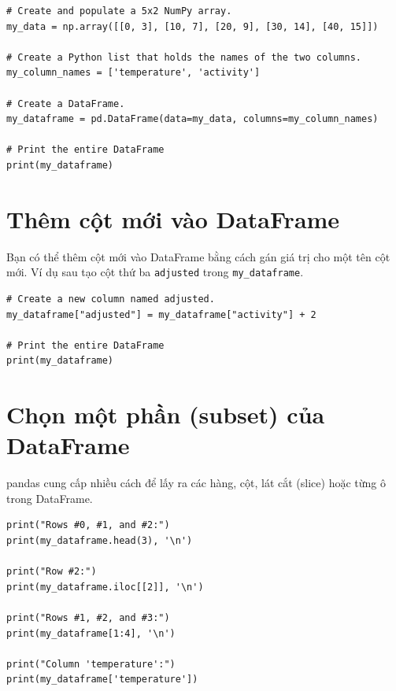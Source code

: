 \documentclass[12pt,a4paper]{article}
\begin{document}
\begin{lstlisting}
# Create and populate a 5x2 NumPy array.
my_data = np.array([[0, 3], [10, 7], [20, 9], [30, 14], [40, 15]])

# Create a Python list that holds the names of the two columns.
my_column_names = ['temperature', 'activity']

# Create a DataFrame.
my_dataframe = pd.DataFrame(data=my_data, columns=my_column_names)

# Print the entire DataFrame
print(my_dataframe)
\end{lstlisting}

\section{Thêm cột mới vào DataFrame}

\begin{phuongphap}[title={Tạo cột mới bằng phép gán}]
Bạn có thể thêm cột mới vào DataFrame bằng cách gán giá trị cho một tên cột mới.
Ví dụ sau tạo cột thứ ba \texttt{adjusted} trong \texttt{my\_dataframe}.
\end{phuongphap}

\begin{lstlisting}
# Create a new column named adjusted.
my_dataframe["adjusted"] = my_dataframe["activity"] + 2

# Print the entire DataFrame
print(my_dataframe)
\end{lstlisting}

\section{Chọn một phần (subset) của DataFrame}

\begin{phuongphap}[title={Lấy hàng/cột/đoạn con}]
pandas cung cấp nhiều cách để lấy ra các hàng, cột, lát cắt (slice) hoặc từng ô trong DataFrame.
\end{phuongphap}

\begin{lstlisting}
print("Rows #0, #1, and #2:")
print(my_dataframe.head(3), '\n')

print("Row #2:")
print(my_dataframe.iloc[[2]], '\n')

print("Rows #1, #2, and #3:")
print(my_dataframe[1:4], '\n')

print("Column 'temperature':")
print(my_dataframe['temperature'])
\end{lstlisting}
\end{document}
